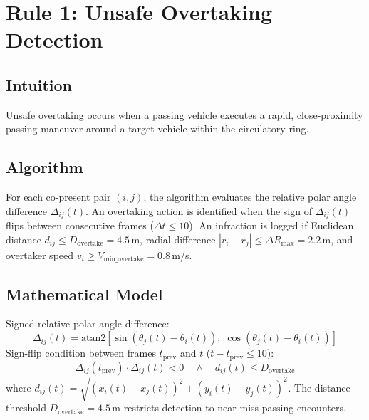 \section{Rule 1: Unsafe Overtaking Detection}
\label{sec:rule1}

\subsection{Intuition}
Unsafe overtaking occurs when a passing vehicle executes a rapid, close-proximity passing maneuver around a target vehicle within the circulatory ring.

\subsection{Algorithm}
For each co-present pair $(i, j)$, the algorithm evaluates the relative polar angle difference $\Delta_{ij}(t)$. An overtaking action is identified when the sign of $\Delta_{ij}(t)$ flips between consecutive frames ($\Delta t \le 10$). An infraction is logged if Euclidean distance $d_{ij} \le D_{\text{overtake}} = 4.5$\,m, radial difference $|r_i - r_j| \le \Delta R_{\text{max}} = 2.2$\,m, and overtaker speed $v_i \ge V_{\text{min\_overtake}} = 0.8$\,m/s.

\subsection{Mathematical Model}
Signed relative polar angle difference:
\begin{equation}
    \Delta_{ij}(t) = \mathrm{atan2}\!\left[\sin(\theta_j(t)-\theta_i(t)),\;\cos(\theta_j(t)-\theta_i(t))\right]
\end{equation}
Sign-flip condition between frames $t_{\text{prev}}$ and $t$ ($t - t_{\text{prev}} \le 10$):
\begin{equation}
    \Delta_{ij}(t_{\text{prev}}) \cdot \Delta_{ij}(t) < 0 \quad\land\quad d_{ij}(t) \le D_{\text{overtake}}
\end{equation}
where $d_{ij}(t) = \sqrt{(x_i(t)-x_j(t))^2 + (y_i(t)-y_j(t))^2}$. The distance threshold $D_{\text{overtake}} = 4.5$\,m restricts detection to near-miss passing encounters.

